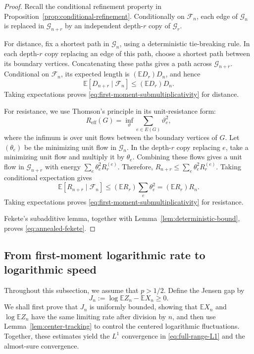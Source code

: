 \documentclass[12pt,preprint]{amsart}
\numberwithin{equation}{section}
\theoremstyle{plain}
\theoremstyle{definition}
\newcommand{\E}{\mathbb E}
\begin{document}
\begin{proof}
Recall the conditional refinement property in
Proposition~\ref{prop:conditional-refinement}.  Conditionally on
$\mathcal F_n$, each edge of $\mathcal G_n$ is replaced in
$\mathcal G_{n+r}$ by an independent depth-$r$ copy of $\mathcal G_r$.

For distance, fix a shortest path in $\mathcal G_n$, using a deterministic
tie-breaking rule.  In each depth-$r$ copy replacing an edge of this path,
choose a shortest path between its boundary vertices.  Concatenating these
paths gives a path across $\mathcal G_{n+r}$.  Conditional on $\mathcal F_n$,
its expected length is $(\E D_r)D_n$, and hence
\[
 \E[D_{n+r}\mid\mathcal F_n]\le (\E D_r)D_n.
\]
Taking expectations proves \eqref{eq:first-moment-submultiplicativity} for
distance.

For resistance, we use Thomson's principle in its unit-resistance form:
\[
 R_{\mathrm{eff}}(G)
 =\inf_{\vartheta}\sum_{e\in E(G)}\vartheta_e^2,
\]
where the infimum is over unit flows between the boundary vertices of $G$.  Let
$(\theta_e)$ be the minimizing unit flow in $\mathcal G_n$.  In the
depth-$r$ copy replacing $e$, take a minimizing unit flow
and multiply it by $\theta_e$.
Combining these flows gives a unit flow in $\mathcal G_{n+r}$ with
energy $\sum_e\theta_e^2R_r^{(e)}$.  Therefore,
$R_{n+r}\le\sum_e\theta_e^2R_r^{(e)}$.
Taking conditional expectation gives
\[
 \E[R_{n+r}\mid\mathcal F_n]
 \le (\E R_r)\sum_e\theta_e^2
 = (\E R_r)R_n.
\]
Taking expectations proves \eqref{eq:first-moment-submultiplicativity} for
resistance.

Fekete's subadditive lemma, together with Lemma~\ref{lem:deterministic-bound}, proves
\eqref{eq:annealed-fekete}.
\end{proof}

\subsection{From first-moment logarithmic rate to logarithmic speed}
\label{sec:annealed-to-typical}

Throughout this subsection, we assume that $p>1/2$.  Define the Jensen gap by
\begin{equation}
\label{eq:jensen-gap}
 J_n:=\log\E Z_n-\E X_n\ge0.
\end{equation}
We shall first prove that $J_n$ is uniformly bounded, showing that $\E X_n$
and $\log\E Z_n$ have the same limiting rate after division by $n$, and then
use Lemma~\ref{lem:center-tracking} to control the centered logarithmic
fluctuations.  Together, these estimates yield the $L^1$ convergence in
\eqref{eq:full-range-L1} and the almost-sure convergence.
\end{document}
